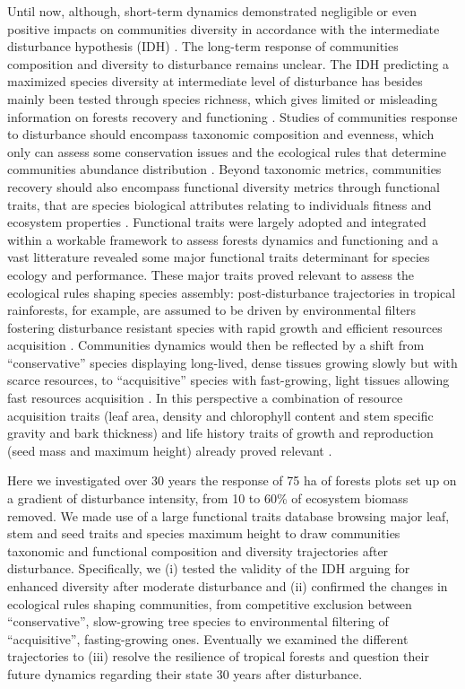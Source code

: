 \documentclass[fleqn,10pt]{ArtEcoFoG} %
\theoremstyle{definition}
\theoremstyle{definition}
\theoremstyle{definition}
\theoremstyle{remark}
\begin{document}
Until now, although, short-term dynamics demonstrated negligible or even
positive impacts on communities diversity in accordance with the
intermediate disturbance hypothesis (IDH)
\citep{Molino2001, Kariuki2006a, Berry2008a}. The long-term response of
communities composition and diversity to disturbance remains unclear.
The IDH predicting a maximized species diversity at intermediate level
of disturbance has besides mainly been tested through species richness,
which gives limited or misleading information on forests recovery and
functioning \citep{Martin2015, Chaudhary2016}. Studies of communities
response to disturbance should encompass taxonomic composition and
evenness, which only can assess some conservation issues and the
ecological rules that determine communities abundance distribution
\citep{Magurran1988, Lavorel2002, Bellwood2006}. Beyond taxonomic
metrics, communities recovery should also encompass functional diversity
metrics \citep{Moretti2009, Baraloto2012a} through functional traits,
that are species biological attributes relating to individuals fitness
and ecosystem properties \citep{Violle2007b, Scheiter2013}. Functional
traits were largely adopted and integrated within a workable framework
to assess forests dynamics and functioning
\citep{Diaz2005, Villeger2008a} and a vast litterature revealed some
major functional traits determinant for species ecology and performance.
These major traits proved relevant to assess the ecological rules
shaping species assembly: post-disturbance trajectories in tropical
rainforests, for example, are assumed to be driven by environmental
filters fostering disturbance resistant species with rapid growth and
efficient resources acquisition \citep{Molino2001, Haddad2008}.
Communities dynamics would then be reflected by a shift from
``conservative'' species displaying long-lived, dense tissues growing
slowly but with scarce resources, to ``acquisitive'' species with
fast-growing, light tissues allowing fast resources acquisition
\citep{TerSteege2001, Reich2014, Herault2011}. In this perspective a
combination of resource acquisition traits (leaf area, density and
chlorophyll content and stem specific gravity and bark thickness) and
life history traits of growth and reproduction (seed mass and maximum
height) already proved relevant
\citep{Wright2004, Westoby2006a, Chave2009b}.

Here we investigated over 30 years the response of 75 ha of forests
plots set up on a gradient of disturbance intensity, from 10 to 60\% of
ecosystem biomass removed. We made use of a large functional traits
database browsing major leaf, stem and seed traits and species maximum
height to draw communities taxonomic and functional composition and
diversity trajectories after disturbance. Specifically, we (i) tested
the validity of the IDH arguing for enhanced diversity after moderate
disturbance and (ii) confirmed the changes in ecological rules shaping
communities, from competitive exclusion between ``conservative'',
slow-growing tree species to environmental filtering of ``acquisitive'',
fasting-growing ones. Eventually we examined the different trajectories
to (iii) resolve the resilience of tropical forests and question their
future dynamics regarding their state 30 years after disturbance.
\end{document}
